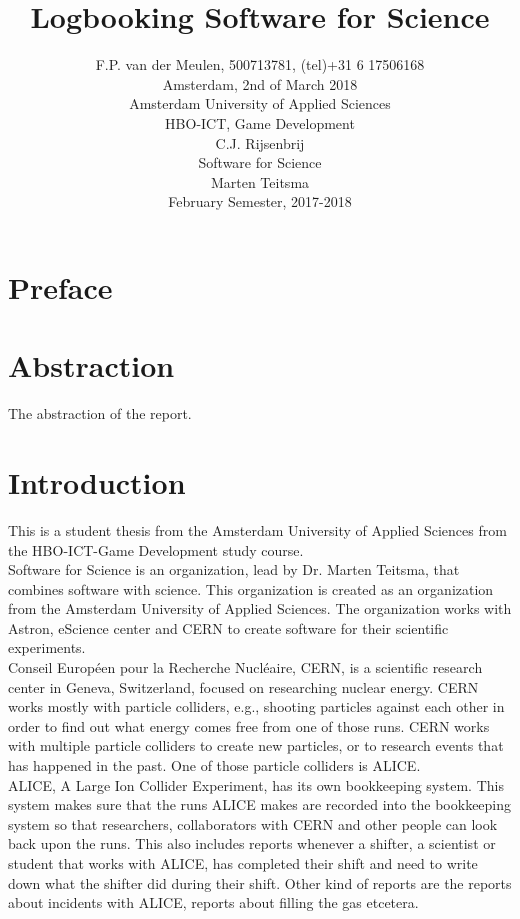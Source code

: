 \documentclass[paper=a4, fontsize=11pt,twoside]{scrartcl}	%
\title{Logbooking Software for Science}
\author{
		F.P. van der Meulen, 500713781, (tel)+31 6 17506168\\
		Amsterdam, 2nd of March 2018\\	
		Amsterdam University of Applied Sciences\\
		HBO-ICT, Game Development\\
		C.J. Rijsenbrij\\	
		Software for Science\\
		Marten Teitsma\\
		February Semester, 2017-2018\\
}
\makeatletter
\def\printauthor{%
    {\centering \large \@author}}
\makeatother
\begin{document}
\lstset{language= Java}

\thispagestyle{empty}		%

\maketitle
\thispagestyle{empty}

\newpage 
\printauthor

\newpage



\newpage
\tableofcontents

\newpage
\section{Preface}


\section{Abstraction}
The abstraction of the report.
\newpage
\section{Introduction}
This is a student thesis from the Amsterdam University of Applied Sciences from the HBO-ICT-Game Development study course.  \\
Software for Science is an organization, lead by Dr. Marten Teitsma, that combines software with science. This organization is created as an organization from the Amsterdam University of Applied Sciences. The organization works with Astron, eScience center and CERN to create software for their scientific experiments. \\
Conseil Européen pour la Recherche Nucléaire, CERN, is a scientific research center in Geneva, Switzerland, focused on researching nuclear energy. CERN works mostly with particle colliders, e.g., shooting particles against each other in order to find out what energy comes free from one of those runs. CERN works with multiple particle colliders to create new particles, or to research events that has happened in the past. One of those particle colliders is ALICE. \\
ALICE, A Large Ion Collider Experiment, has its own bookkeeping system. This system makes sure that the runs ALICE makes are recorded into the bookkeeping system so that researchers, collaborators with CERN and other people can look back upon the runs. This also includes reports whenever a shifter, a scientist or student that works with ALICE, has completed their shift and need to write down what the shifter did during their shift. Other kind of reports are the reports about incidents with ALICE, reports about filling the gas etcetera. \\
\end{document}
